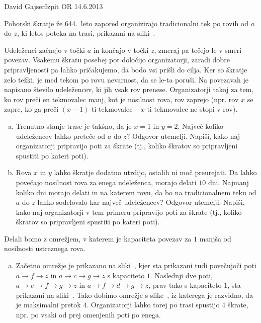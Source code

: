 \begin{naloga}{David Gajser}{Izpit OR 14.6.2013}
\begin{vprasanje}
Pohorski škratje že 644.~leto zapored
organizirajo tradicionalni tek po rovih od $a$ do $z$,
ki letos poteka na trasi, prikazani na sliki~\fig.

Udeleženci začnejo v točki $a$ in končajo v točki $z$,
zmeraj pa tečejo le v smeri povezav.
Vsakemu škratu posebej pot določijo organizatorji,
zaradi dobre pri\-prav\-lje\-no\-sti pa lahko pričakujemo,
da bodo vsi prišli do cilja.
Ker so škratje zelo težki,
je med tekom po rovu nevarnost, da se le-ta poruši.
Na povezavah je napisano število udeležencev, ki jih vsak rov prenese.
Organizatorji takoj za tem, ko rov preči en tekmovalec manj,
kot je nosilnost rova, rov zaprejo
(npr. rov $x$ se zapre, ko ga preči $(x-1)$-ti tekmovalec
-- $x$-ti tekmovalec ne stopi v rov).

\begin{enumerate}[(a)]
\item Trenutno stanje trase je takšno, da je $x = 1$ in $y = 2$.
Največ koliko udeležencev lahko preteče od $a$ do $z$?
Odgovor utemelji.
Napiši, kako naj organizatorji pripravijo poti za škrate
(tj., koliko škratov so pripravljeni spustiti po kateri poti).

\item Rova $x$ in $y$ lahko škratje dodatno utrdijo,
ostalih ni moč preurejati.
Da lahko povečajo nosilnost rova za enega udeleženca, morajo delati $10$ dni.
Najmanj koliko dni morajo delati in na katerem rovu,
da bo na tradicionalnem teku od $a$ do $z$
lahko sodelovalo kar največ udeležencev?
Odgovor utemelji.
Napiši, kako naj organizatorji v tem primeru pripravijo poti za škrate
(tj., koliko škratov so pripravljeni spustiti po kateri poti).
\end{enumerate}

\begin{slika}
\pgfslika
{}
\end{slika}
\end{vprasanje}

\begin{odgovor}
Delali bomo z omrežjem,
v katerem je kapaciteta povezav za $1$ manjša od nosilnosti ustreznega rova.

\begin{enumerate}[(a)]
\item Začetno omrežje je prikazano na sliki~,
kjer sta prikazani tudi povečujoči poti
$a \to f \to z$ in $a \to c \to g \to z$ s kapaciteto $1$.
Naslednji dve poti,
$a \to e \to f \to g \to z$ in $a \to f \to d \to g \to z$,
prav tako s kapaciteto $1$,
sta prikazani na sliki~.
Tako dobimo omrežje s slike~,
iz katerega je razvidno, da je maksimalni pretok $4$.
Organizatorji lahko torej po trasi spustijo $4$ škrate,
npr. po vsaki od prej omenjenih poti po enega.


\end{enumerate}
\end{odgovor}
\end{naloga}
